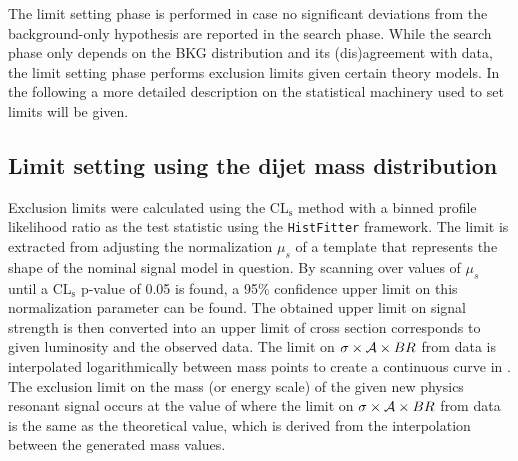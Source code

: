 
The limit setting phase is performed in case no significant deviations from the
background-only hypothesis are reported in the search phase. While the search
phase only depends on the BKG
distribution and its (dis)agreement with data, the limit setting phase performs
exclusion limits given certain theory models. In the following a more detailed
description on the statistical machinery used to set limits will be given.

\subsection{Limit setting using the dijet mass distribution}

Exclusion limits were calculated using the CL$_\mathrm{s}$ method with a binned profile likelihood ratio as the test
statistic using the \texttt{HistFitter} \cite{HistFitter:2014} framework.
The limit is extracted from adjusting the normalization $\mu_{s}$ of a template that represents the shape of the nominal signal model in question.
By scanning over values of $\mu_{s}$ until a CL$_\mathrm{s}$ p-value of 0.05 is found,
a 95\% confidence upper limit on this normalization parameter can be found.
The obtained upper limit on signal strength is then converted into an upper limit of cross section
corresponds to given luminosity and the observed data.
The limit on $\sigma\times {\cal A} \times BR$ from data is interpolated logarithmically
between mass points to create a continuous curve in \mjj{}.
The exclusion limit on the mass (or energy scale) of the
given new physics resonant signal occurs at the value of \mjj{} where the limit
on $\sigma\times {\cal A} \times BR$ from data is the same as the
theoretical value, which is derived from the interpolation between
the generated mass values.

